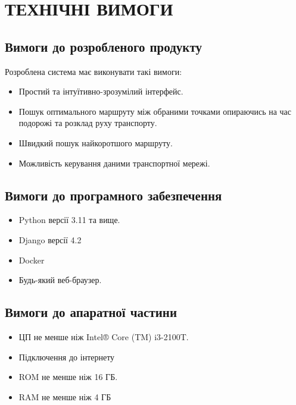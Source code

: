 \begingroup
\renewcommand{\cleardoublepage}{}
\renewcommand{\clearpage}{}
\chapter{ТЕХНІЧНІ ВИМОГИ}
\endgroup

\section{Вимоги до розробленого продукту}

\vspace{-\baselineskip}

Розроблена система має виконувати такі вимоги:

\begin{itemize}
\item Простий та інтуїтивно-зрозумілий інтерфейс.
\item Пошук оптимального маршруту між обраними точками опираючись на час подорожі та розклад руху транспорту.
\item Швидкий пошук найкоротшого маршруту.
\item Можливість керування даними транспортної мережі.
\end{itemize}

\vspace{-\baselineskip}

\section{Вимоги до програмного забезпечення}

\vspace{-\baselineskip}

\begin{itemize}
\item Python версії 3.11 та вище.
\item Django версії 4.2
\item Docker
\item Будь-який веб-браузер.
\end{itemize}		

\vspace{-\baselineskip}

\section{Вимоги до апаратної частини}

\vspace{-\baselineskip}

\begin{itemize}
\item ЦП не менше ніж Intel® Core (TM) i3-2100T.
\item Підключення до інтернету
\item ROM не менше ніж 16 ГБ.
\item RAM не менше ніж 4 ГБ
\end{itemize}

\bigskip
\bigskip
\bigskip